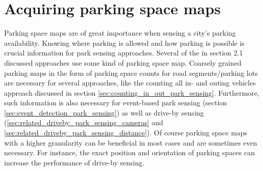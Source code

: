 \begin{table}

\caption{All used machine learning models to detect a city's parking space availability.}
\label{table:comparison_ml_approaches}
\end{table}




\section{Acquiring parking space maps}
\label{sec:acquiring_parking_space_maps}

Parking space maps are of great importance when sensing a city's parking availability. Knowing where parking is allowed and how parking is possible is crucial information for park sensing approaches. Several of the in section 2.1 discussed approaches use some kind of parking space map. Coarsely grained parking maps in the form of parking space counts for road segments/parking lots are necessary for several approaches, like the counting all in- and outing vehicles approach discussed in section \ref{sec:counting_in_out_park_sensing}. Furthermore, such information is also necessary for event-based park sensing (section \ref{sec:event_detection_park_sensing}) as well as drive-by sensing (\ref{sec:related_driveby_park_sensing_cameras} and \ref{sec:related_driveby_park_sensing_distance}). Of course parking space maps with a higher granularity can be beneficial in most cases and are sometimes even necessary. For instance, the exact position and orientation of parking spaces can increase the performance of drive-by sensing.

